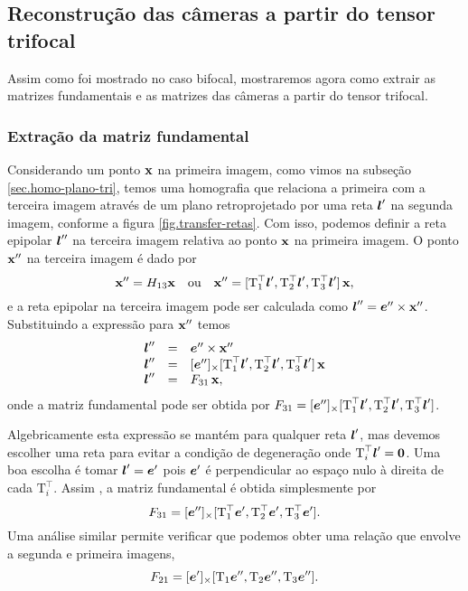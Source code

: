 \subsection{Reconstrução das câmeras a partir do tensor trifocal}
Assim como foi mostrado no caso bifocal, mostraremos agora como extrair as matrizes fundamentais e as matrizes das câmeras a partir do tensor trifocal.

\subsubsection{Extração da matriz fundamental}\label{sec.extracao-F-tri}
Considerando um ponto $\mathbf{x}$ na primeira imagem, como vimos na subseção \ref{sec.homo-plano-tri}, temos uma homografia que relaciona a primeira com a terceira imagem através de um plano retroprojetado por uma reta $\boldsymbol{l}'$ na segunda imagem, conforme a figura \ref{fig.transfer-retas}. Com isso, podemos definir a reta epipolar $\boldsymbol{l}''$ na terceira imagem relativa ao ponto $\mathbf{x}$ na primeira imagem. O ponto $\mathbf{x}''$ na terceira imagem é dado por
\begin{equation*}
\mathbf{x}''=H_{13}\mathbf{x}\quad\text{ou}\quad\mathbf{x}''=[\mbox{T}_1^\top\boldsymbol{l}',\mbox{T}_2^\top\boldsymbol{l}',\mbox{T}_3^\top\boldsymbol{l}']\,\mathbf{x},
\end{equation*}  
e a reta epipolar na terceira imagem pode ser calculada como $\boldsymbol{l}''=\boldsymbol{e}''\times\mathbf{x}''$. Substituindo a expressão para $\mathbf{x}''$ temos
\begin{equation*}
\begin{array}{rcl}
\boldsymbol{l}''&=&\boldsymbol{e}''\times\mathbf{x}''\\
\boldsymbol{l}''&=&[\boldsymbol{e}'']_\times[\mbox{T}_1^\top\boldsymbol{l}',\mbox{T}_2^\top\boldsymbol{l}',\mbox{T}_3^\top\boldsymbol{l}']\,\mathbf{x}\\
\boldsymbol{l}''&=&F_{31}\,\mathbf{x},
\end{array}
\end{equation*}
onde a matriz fundamental pode ser obtida por $F_{31}=[\boldsymbol{e}'']_\times[\mbox{T}_1^\top\boldsymbol{l}',\mbox{T}_2^\top\boldsymbol{l}',\mbox{T}_3^\top\boldsymbol{l}']$.

Algebricamente esta expressão se mantém para qualquer reta $\boldsymbol{l}'$, mas devemos escolher uma reta para evitar a condição de degeneração onde $\mbox{T}^\top_i\boldsymbol{l}'={\bf 0}$. Uma boa escolha é tomar $\boldsymbol{l}'=\boldsymbol{e}'$ pois $\boldsymbol{e}'$ é perpendicular ao espaço nulo à direita de cada $\mbox{T}^\top_i$. Assim , a matriz fundamental é obtida simplesmente por
\begin{equation*}
F_{31}=[\boldsymbol{e}'']_\times[\mbox{T}_1^\top\boldsymbol{e}',\mbox{T}_2^\top\boldsymbol{e}',\mbox{T}_3^\top\boldsymbol{e}'].
\end{equation*} 
Uma análise similar permite verificar que podemos obter uma relação que envolve a segunda e primeira imagens,
\begin{equation*}
F_{21}=[\boldsymbol{e}']_\times[\mbox{T}_1\boldsymbol{e}'',	\mbox{T}_2\boldsymbol{e}'',\mbox{T}_3\boldsymbol{e}''].
\end{equation*}

